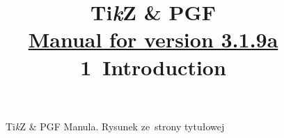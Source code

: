 \documentclass[a4paper,11pt]{article}
\title{Ti\emph{k}Z \& PGF \\
  \href{http://piotrkosoft.net/pub/mirrors/CTAN/graphics/pgf/base/doc/pgfmanual.pdf}{Manual for version 3.1.9a} \\
  1~Introduction}
\author{}
\begin{document}





\maketitle %






\begin{figure}[ht]

  \centering

  \begin{tikzpicture}



  \end{tikzpicture}

  \caption{Ti\textit{k}Z \& PGF Manula. Rysunek ze~strony tytułowej}

\end{figure}





\newpage
























\end{document}
